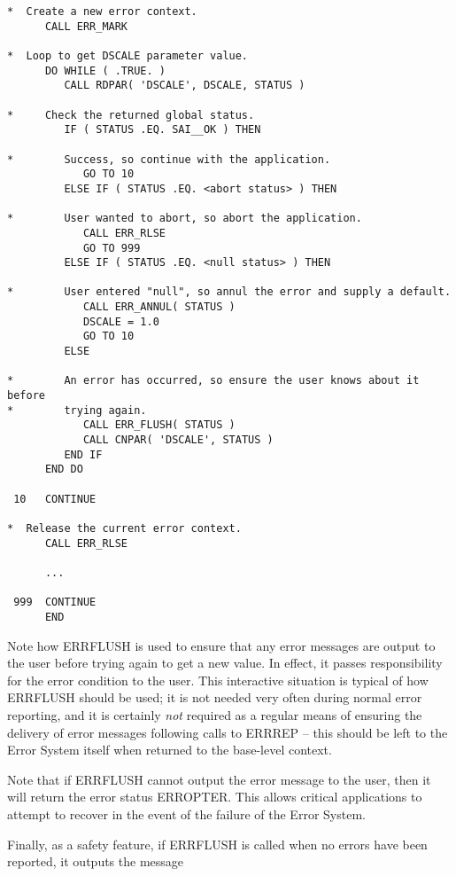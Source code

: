 \documentclass[twoside,11pt]{article}
\renewcommand{\_}{\texttt{\symbol{95}}}
\begin{document}
\begin {small}
\begin{verbatim}
*  Create a new error context.
      CALL ERR_MARK

*  Loop to get DSCALE parameter value.
      DO WHILE ( .TRUE. )
         CALL RDPAR( 'DSCALE', DSCALE, STATUS )

*     Check the returned global status.
         IF ( STATUS .EQ. SAI__OK ) THEN

*        Success, so continue with the application.
            GO TO 10
         ELSE IF ( STATUS .EQ. <abort status> ) THEN

*        User wanted to abort, so abort the application.
            CALL ERR_RLSE
            GO TO 999
         ELSE IF ( STATUS .EQ. <null status> ) THEN

*        User entered "null", so annul the error and supply a default.
            CALL ERR_ANNUL( STATUS )
            DSCALE = 1.0
            GO TO 10
         ELSE

*        An error has occurred, so ensure the user knows about it before
*        trying again.
            CALL ERR_FLUSH( STATUS )
            CALL CNPAR( 'DSCALE', STATUS )
         END IF
      END DO

 10   CONTINUE

*  Release the current error context.
      CALL ERR_RLSE

      ...

 999  CONTINUE
      END
\end{verbatim}
\end {small}

Note how ERR\_FLUSH is used to ensure that any error messages are output to
the user before trying again to get a new value. 
In effect, it passes responsibility for the error condition to the user.
This interactive situation is typical of how ERR\_FLUSH should 
be used; it is not needed very often during normal error reporting, and it 
is certainly \emph{not} required as a regular means of ensuring the delivery
of error messages following calls to ERR\_REP --
this should be left to the Error System itself when returned to the base-level
context.

Note that if ERR\_FLUSH cannot output the error message to the user, then it
will return the error status ERR\_\_OPTER.
This allows critical applications to attempt to recover in the event of the
failure of the Error System.

Finally, as a safety feature, if ERR\_FLUSH is called when no errors have
been reported, it outputs the message 
\end{document}
